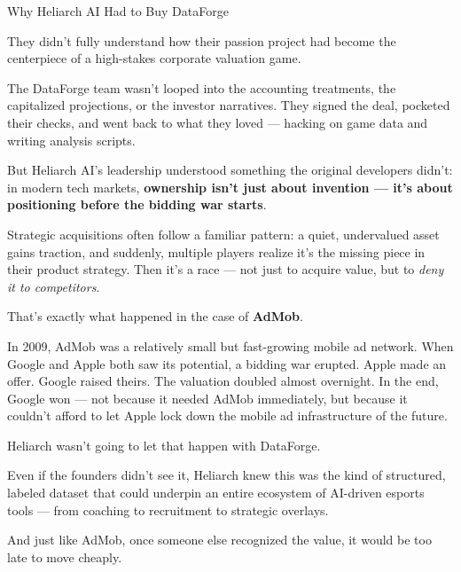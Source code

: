 \begin{HistoricalSidebar}{Why Heliarch AI Had to Buy DataForge}

    They didn’t fully understand how their passion project had become the centerpiece of a high-stakes corporate valuation game.

    \medskip

    The DataForge team wasn’t looped into the accounting treatments, the capitalized projections, or the investor narratives. They signed the deal, pocketed their checks, and went back to what they loved — hacking on game data and writing analysis scripts.

    \medskip
    
    But Heliarch AI’s leadership understood something the original developers didn’t:
    in modern tech markets, \textbf{ownership isn’t just about invention — it’s about positioning before the bidding war starts}.
    
    \medskip
    
    Strategic acquisitions often follow a familiar pattern: a quiet, undervalued asset gains traction, and suddenly, multiple players realize it’s the missing piece in their product strategy. Then it’s a race — not just to acquire value, but to \textit{deny it to competitors}.

    \medskip
    
    That’s exactly what happened in the case of \textbf{AdMob}.

    \medskip
    
    In 2009, AdMob was a relatively small but fast-growing mobile ad network. When Google and Apple both saw its potential, a bidding war erupted. Apple made an offer. Google raised theirs. The valuation doubled almost overnight. In the end, Google won — not because it needed AdMob immediately, but because it couldn't afford to let Apple lock down the mobile ad infrastructure of the future.
    
    \medskip
    
    Heliarch wasn’t going to let that happen with DataForge.

    \medskip
    
    Even if the founders didn’t see it, Heliarch knew this was the kind of structured, labeled dataset that could underpin an entire ecosystem of AI-driven esports tools — from coaching to recruitment to strategic overlays.
    
    \medskip
    
    And just like AdMob, once someone else recognized the value, it would be too late to move cheaply.
    

\end{HistoricalSidebar}
